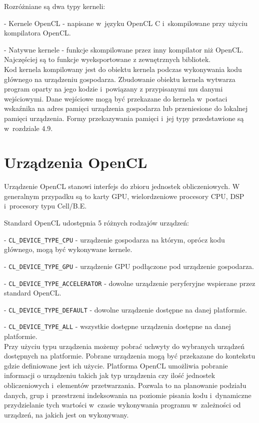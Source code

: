 Rozróżniane są dwa typy kerneli:

- Kernele OpenCL - napisane w~języku OpenCL C i~skompilowane przy użyciu kompilatora OpenCL.

- Natywne kernele - funkcje skompilowane przez inny kompilator niż OpenCL. Najczęściej są to funkcje wyeksportowane z zewnętrznych bibliotek.\\

Kod kernela kompilowany jest do obiektu kernela podczas wykonywania kodu głównego na urządzeniu gospodarza. Zbudowanie obiektu kernela wytwarza program oparty na jego kodzie i~powiązany z przypisanymi mu danymi wejściowymi. Dane wejściowe mogą być przekazane do kernela w~postaci wskaźnika na adres pamięci urządzenia gospodarza lub przeniesione do lokalnej pamięci urządzenia. Formy przekazywania pamięci i~jej typy przedstawione są w~rozdziale 4.9.

\section{Urządzenia OpenCL}\label{sec:OpenC21L}

Urządzenie OpenCL stanowi interfejs do zbioru jednostek obliczeniowych. W generalnym przypadku są to karty GPU, wielordzeniowe procesory CPU, DSP i~procesory typu Cell/B.E.

Standard OpenCL udostępnia 5 różnych rodzajów urządzeń:

- \verb|CL_DEVICE_TYPE_CPU| - urządzenie gospodarza na którym, oprócz kodu głównego, mogą być wykonywane kernele.

- \verb|CL_DEVICE_TYPE_GPU| - urządzenie GPU podłączone pod urządzenie gospodarza.

- \verb|CL_DEVICE_TYPE_ACCELERATOR| - dowolne urządzenie peryferyjne wspierane przez standard OpenCL.

- \verb|CL_DEVICE_TYPE_DEFAULT| - dowolne urządzenie dostępne na danej platformie.

- \verb|CL_DEVICE_TYPE_ALL| - wszystkie dostępne urządzenia dostępne na danej platformie.\\

Przy użyciu typu urządzenia możemy pobrać uchwyty do wybranych urządzeń dostępnych na platformie. Pobrane urządzenia mogą być przekazane do kontekstu gdzie definiowane jest ich użycie. Platforma OpenCL umożliwia pobranie informacji o urządzeniu takich jak typ urządzenia czy ilość jednostek obliczeniowych i~elementów przetwarzania. Pozwala to na planowanie podziału danych, grup i~przestrzeni indeksowania na poziomie pisania kodu i~dynamiczne przydzielanie tych wartości w~czasie wykonywania programu w~zależności od urządzeń, na jakich jest on wykonywany.
 
